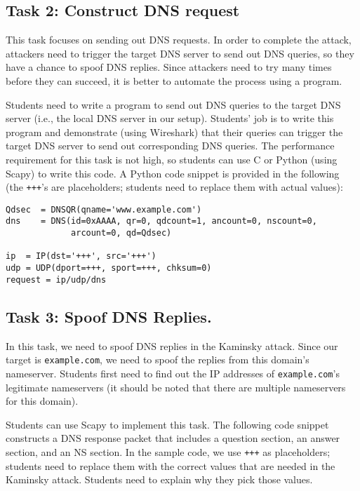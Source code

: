 \subsection{Task 2: Construct DNS request} 

This task focuses on sending out DNS requests. 
In order to complete the attack, attackers need to trigger the target 
DNS server to send out DNS queries, so they have a chance 
to spoof DNS replies. Since attackers need to try many times before they 
can succeed, it is better to automate the process using a program. 

Students need to write a program to send out DNS queries to the target DNS 
server (i.e., the local DNS server in our setup). 
Students' job is to write this program
and demonstrate (using Wireshark) that their queries can
trigger the target DNS server to send out corresponding DNS queries.
The performance requirement for this task is not high, so
students can use C or Python (using Scapy) to write this code. 
A Python code snippet is provided in the following (the 
\texttt{+++}'s are placeholders; students need to replace them
with actual values): 

\begin{lstlisting}
Qdsec  = DNSQR(qname='www.example.com')
dns    = DNS(id=0xAAAA, qr=0, qdcount=1, ancount=0, nscount=0,
             arcount=0, qd=Qdsec)

ip  = IP(dst='+++', src='+++')
udp = UDP(dport=+++, sport=+++, chksum=0)
request = ip/udp/dns
\end{lstlisting}
 


\subsection{Task 3: Spoof DNS Replies.}   

In this task, we need to spoof DNS replies in the Kaminsky attack. 
Since our target is \texttt{example.com}, we need to spoof
the replies from this domain's nameserver. Students first need to 
find out the IP addresses of \texttt{example.com}'s legitimate 
nameservers (it should be noted that there are multiple 
nameservers for this domain).

Students can use Scapy to implement this task. The following 
code snippet constructs a DNS response packet that includes 
a question section, an answer section, and an NS section. 
In the sample code, we use \texttt{+++} as placeholders; 
students need to replace them with the correct values 
that are needed in the Kaminsky attack. Students need to explain
why they pick those values. 

